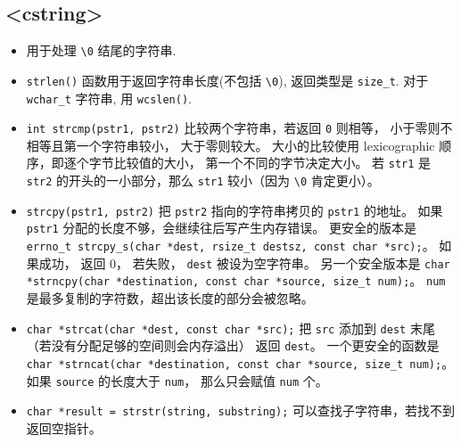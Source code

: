 \subsection{<cstring>}
\begin{itemize}
\item 用于处理 \verb`\0` 结尾的字符串.
\item \verb`strlen()` 函数用于返回字符串长度(不包括 \verb`\0`), 返回类型是 \verb`size_t`. 对于 \verb`wchar_t` 字符串, 用 \verb`wcslen()`.
\item \verb|int strcmp(pstr1, pstr2)| 比较两个字符串，若返回 \verb|0| 则相等， 小于零则不相等且第一个字符串较小， 大于零则较大。 大小的比较使用 lexicographic 顺序，即逐个字节比较值的大小， 第一个不同的字节决定大小。 若 \verb|str1| 是 \verb|str2| 的开头的一小部分，那么 \verb|str1| 较小（因为 \verb|\0| 肯定更小）。
\item \verb`strcpy(pstr1, pstr2)` 把 \verb`pstr2` 指向的字符串拷贝的 \verb`pstr1` 的地址。 如果 \verb|pstr1| 分配的长度不够，会继续往后写产生内存错误。 更安全的版本是 \verb|errno_t strcpy_s(char *dest, rsize_t destsz, const char *src);|。 如果成功， 返回 0， 若失败， \verb|dest| 被设为空字符串。 另一个安全版本是 \verb|char *strncpy(char *destination, const char *source, size_t num);|。 \verb|num| 是最多复制的字符数，超出该长度的部分会被忽略。
\item \verb|char *strcat(char *dest, const char *src);| 把 \verb|src| 添加到 \verb|dest| 末尾（若没有分配足够的空间则会内存溢出） 返回 \verb|dest|。 一个更安全的函数是 \verb|char *strncat(char *destination, const char *source, size_t num);|。 如果 \verb|source| 的长度大于 \verb|num|， 那么只会赋值 \verb|num| 个。
\item \verb|char *result = strstr(string, substring);| 可以查找子字符串，若找不到返回空指针。
\end{itemize}

